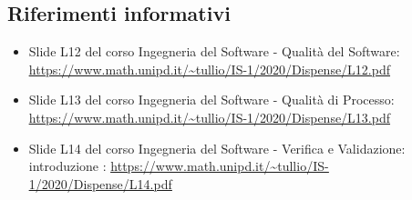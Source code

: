 \subsection{Riferimenti informativi}
\begin{itemize}
	\item Slide L12 del corso Ingegneria del Software - Qualità del Software:
	\uline{\url{https://www.math.unipd.it/~tullio/IS-1/2020/Dispense/L12.pdf}}
	\item Slide L13 del corso Ingegneria del Software - Qualità di Processo:
	\uline{\url{https://www.math.unipd.it/~tullio/IS-1/2020/Dispense/L13.pdf}}
	\item Slide L14 del corso Ingegneria del Software - Verifica e Validazione: introduzione :
	\uline{\url{https://www.math.unipd.it/~tullio/IS-1/2020/Dispense/L14.pdf}}
\end{itemize}